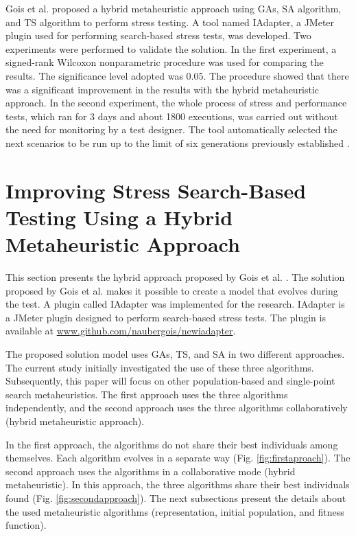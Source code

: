 \documentclass{bmcart}
\begin{document}
Gois et al. proposed a hybrid metaheuristic approach using GAs, SA algorithm, and TS algorithm to perform stress testing. A tool named IAdapter, a JMeter plugin used for performing search-based stress tests, was developed. Two experiments were performed to validate the solution. In the first experiment, a signed-rank Wilcoxon nonparametric procedure was used for comparing the results. The significance level adopted was 0.05. The procedure showed that there was a significant improvement in the results with the hybrid metaheuristic approach.
In the second experiment, the whole process of stress and performance tests, which ran for 3 days and about 1800 executions, was carried out without the need for monitoring by a test designer. The tool automatically selected the next scenarios to be run up to the limit of six generations previously established \citep{Gois2016}. 


\section{Improving Stress Search-Based Testing Using a Hybrid Metaheuristic Approach}

This section presents the hybrid approach proposed by Gois et al. \citep{Gois2016}. The solution proposed by Gois et al. makes it possible to create a model that evolves during the test. A plugin called IAdapter was implemented for the research. IAdapter is a JMeter plugin designed to perform search-based stress tests. The plugin is available at \url{www.github.com/naubergois/newiadapter}.  


The proposed solution model uses GAs, TS, and SA in two different approaches. The current study initially investigated the use of these three algorithms. Subsequently, this paper will focus on other population-based and single-point search metaheuristics. The first approach uses the three algorithms independently, and the second approach uses the three algorithms collaboratively (hybrid metaheuristic approach).

In the first approach, the algorithms do not share their best individuals among themselves. Each algorithm evolves in a separate way (Fig. \ref{fig:firstaproach}). The second approach uses the algorithms in a collaborative mode (hybrid metaheuristic). In this approach, the three algorithms share their best individuals found (Fig. \ref{fig:secondapproach}). The next subsections present the details about the used metaheuristic algorithms (representation, initial population, and fitness function).
\end{document}
